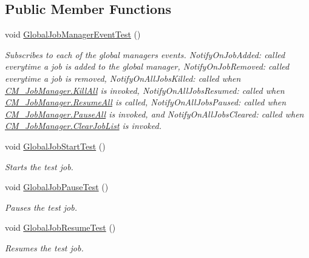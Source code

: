 \subsection*{Public Member Functions}
\begin{DoxyCompactItemize}
\item 
void \hyperlink{class_example_job_manager_test_a2e12fad77a94ff2cbcc3b7da2cb16362}{Global\+Job\+Manager\+Event\+Test} ()
\begin{DoxyCompactList}\small\item\em Subscribes to each of the global managers events. Notify\+On\+Job\+Added\+: called everytime a job is added to the global manager, Notify\+On\+Job\+Removed\+: called everytime a job is removed, Notify\+On\+All\+Jobs\+Killed\+: called when \hyperlink{class_c_m___job_manager_ab5a27b84b4fd3893e1dc271570930e62}{C\+M\+\_\+\+Job\+Manager.\+Kill\+All} is invoked, Notify\+On\+All\+Jobs\+Resumed\+: called when \hyperlink{class_c_m___job_manager_a838152b138f04a0c4c254f3b56bd31fe}{C\+M\+\_\+\+Job\+Manager.\+Resume\+All} is called, Notify\+On\+All\+Jobs\+Paused\+: called when \hyperlink{class_c_m___job_manager_ab1e48755bb929871595acfca595ae01b}{C\+M\+\_\+\+Job\+Manager.\+Pause\+All} is invoked, and Notify\+On\+All\+Jobs\+Cleared\+: called when \hyperlink{class_c_m___job_manager_a7684d8a980b6dd3004feb35e978e2163}{C\+M\+\_\+\+Job\+Manager.\+Clear\+Job\+List} is invoked. \end{DoxyCompactList}\item 
void \hyperlink{class_example_job_manager_test_ae4b00ba638975a806c58d4fea116406b}{Global\+Job\+Start\+Test} ()
\begin{DoxyCompactList}\small\item\em Starts the test job. \end{DoxyCompactList}\item 
void \hyperlink{class_example_job_manager_test_ab38e4ec613dc3f50c4204ac3e1963dac}{Global\+Job\+Pause\+Test} ()
\begin{DoxyCompactList}\small\item\em Pauses the test job. \end{DoxyCompactList}\item 
void \hyperlink{class_example_job_manager_test_a2ba384ab22381d74acbf229ad81f5e6e}{Global\+Job\+Resume\+Test} ()
\begin{DoxyCompactList}\small\item\em Resumes the test job. \end{DoxyCompactList}\item 

\end{DoxyCompactItemize}
